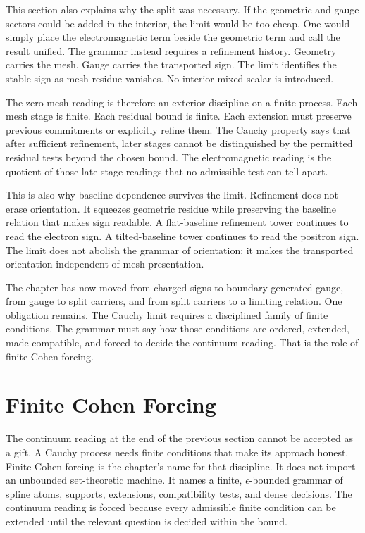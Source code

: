 This section also explains why the split was necessary. If the geometric and
gauge sectors could be added in the interior, the limit would be too cheap.
One would simply place the electromagnetic term beside the geometric term
and call the result unified. The grammar instead requires a refinement
history. Geometry carries the mesh. Gauge carries the transported sign. The
limit identifies the stable sign as mesh residue vanishes. No interior mixed
scalar is introduced.

The zero-mesh reading is therefore an exterior discipline on a finite
process. Each mesh stage is finite. Each residual bound is finite. Each
extension must preserve previous commitments or explicitly refine them. The
Cauchy property says that after sufficient refinement, later stages cannot
be distinguished by the permitted residual tests beyond the chosen bound.
The electromagnetic reading is the quotient of those late-stage readings
that no admissible test can tell apart.

This is also why baseline dependence survives the limit. Refinement does
not erase orientation. It squeezes geometric residue while preserving the
baseline relation that makes sign readable. A flat-baseline refinement tower
continues to read the electron sign. A tilted-baseline tower continues to
read the positron sign. The limit does not abolish the grammar of
orientation; it makes the transported orientation independent of mesh
presentation.

The chapter has now moved from charged signs to boundary-generated gauge,
from gauge to split carriers, and from split carriers to a limiting
relation. One obligation remains. The Cauchy limit requires a disciplined
family of finite conditions. The grammar must say how those conditions are
ordered, extended, made compatible, and forced to decide the continuum
reading. That is the role of finite Cohen forcing.

\section{Finite Cohen Forcing}

The continuum reading at the end of the previous section cannot be accepted
as a gift. A Cauchy process needs finite conditions that make its approach
honest. Finite Cohen forcing is the chapter's name for that discipline. It
does not import an unbounded set-theoretic machine. It names a finite,
\(\epsilon\)-bounded grammar of spline atoms, supports, extensions,
compatibility tests, and dense decisions. The continuum reading is forced
because every admissible finite condition can be extended until the relevant
question is decided within the bound.

